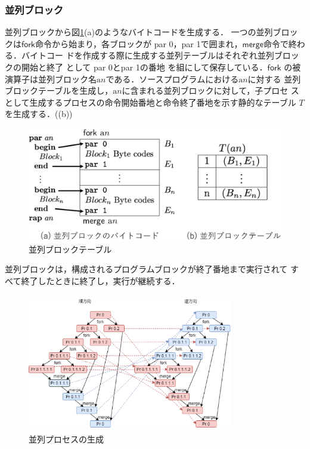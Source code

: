\documentclass[submit,PRO]{ipsj}
\newcommand{\bcode}[1]{$\mathsf{#1}$}
\newcommand{\alabel}[1]{\mathrm{a}#1}
\begin{document}
\subsubsection{並列ブロック}

並列ブロックから図\ref{fig:parallelTable}(a)のようなバイトコードを生成する．
%
一つの並列ブロックは\bcode{fork}命令から始まり，各ブロックが
{\sf par 0}，{\sf par 1}で囲まれ，\bcode{merge}命令で終わる．バイトコー
ドを作成する際に生成する並列テーブルはそれぞれ並列ブロックの開始と終了%
として%
{\sf par 0}と{\sf par 1}の番地
を組にして保存している．\bcode{fork}
の被演算子は並列ブロック名$\alabel{n}$である．ソースプログラムにおける$\alabel{n}$に対する
並列ブロックテーブルを生成し，$\alabel{n}$に含まれる並列ブロックに対して，子プロセ
スとして生成するプロセスの命令開始番地と命令終了番地を示す静的なテーブル
$T$を生成する．((b))

\begin{figure}[tb]
\includegraphics[width=.8\linewidth]{./parallelTable_1-r1.eps}
\caption{並列ブロックテーブル}
\label{fig:parallelTable}
\end{figure}

並列ブロックは，構成されるプログラムブロックが終了番地まで実行されて
すべて終了したときに終了し，実行が継続する．

\begin{figure}[tb]
\includegraphics[height=6.0cm,width=9.0cm]{./parallel.eps}
\caption{並列プロセスの生成}
\label{fig:parallel}
\end{figure}
\end{document}
